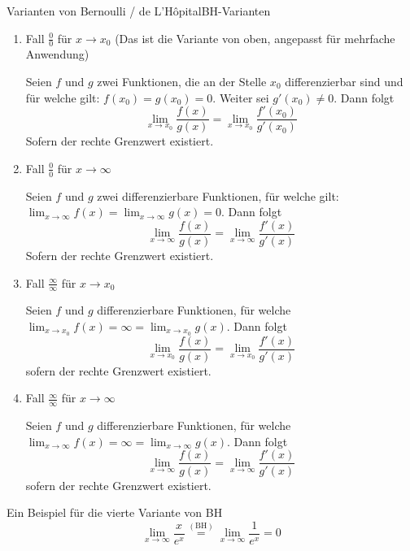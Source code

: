 \begin{satz}
	{Varianten von Bernoulli / de L'Hôpital}{BH-Varianten}
	\begin{enumerate}
		\item Fall $\frac{0}{0}$ für $x \rightarrow x_0$ (Das ist die Variante von oben, angepasst für mehrfache Anwendung)

		      Seien $f$ und $g$ zwei Funktionen, die an der Stelle $x_0$ differenzierbar sind und für welche gilt: $f(x_0) = g(x_0) = 0$. Weiter sei $g'(x_0) \neq 0$. Dann folgt
		      \[
			      \lim_{{x \to x_0}} \frac{f(x)}{g(x)} = \lim_{{x \to x_0}}\frac{f'(x_0)}{g'(x_0)}
		      \]
		      Sofern der rechte Grenzwert existiert.
		\item Fall $\frac{0}{0}$ für $x \rightarrow \infty$

		      Seien $f$ und $g$ zwei differenzierbare Funktionen, für welche gilt: $\lim_{{x \to \infty}} f(x) = \lim_{{x \to \infty}} g(x) = 0$. Dann folgt
		      \[
			      \lim_{{x \to \infty}} \frac{f(x)}{g(x)} = \lim_{{x \to \infty}} \frac{f'(x)}{g'(x)}
		      \]
		      Sofern der rechte Grenzwert existiert.
		\item Fall $\frac{\infty}{\infty}$ für $x \rightarrow x_0$

		      Seien $f$ und $g$ differenzierbare Funktionen, für welche $\lim_{{x \to x_0}} f(x) = \infty = \lim_{{x \to x_0}} g(x)$. Dann folgt
		      $$\lim_{{x \to x_0}} \frac{f(x)}{g(x)} =\lim_{{x \to x_0}} \frac{f'(x)}{g'(x)}$$
		      sofern der rechte Grenzwert existiert.



		\item Fall $\frac{\infty}{\infty}$ für $x \rightarrow \infty$

		      Seien $f$ und $g$ differenzierbare Funktionen, für welche $\lim_{{x \to \infty}} f(x) = \infty = \lim_{{x \to \infty}} g(x)$. Dann folgt
		      $$\lim_{{x \to \infty}} \frac{f(x)}{g(x)} =\lim_{{x \to \infty}} \frac{f'(x)}{g'(x)}$$
		      sofern der rechte Grenzwert existiert.


	\end{enumerate}
\end{satz}

\begin{bsp}
	{Ein Beispiel für die vierte Variante von BH}{}
	\[
		\lim_{{x \to \infty}} \frac{x}{e^x} \overset{(\text{BH})}{=}
		\lim_{{x \to \infty}} \frac{1}{e^x} = 0
	\]

\end{bsp}


